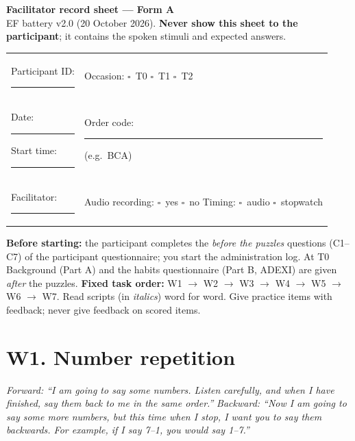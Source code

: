 \documentclass[10pt,a4paper]{article}
\newcommand{\blank}[1][1.2cm]{\rule{#1}{0.4pt}}
\newcommand{\bx}{$\square$}
\begin{document}
\begin{center}{\LARGE\bfseries Facilitator record sheet --- Form A}\\[3pt]
{\small EF battery v2.0 (20 October 2026). \textbf{Never show this sheet to the participant}; it contains the spoken stimuli and expected answers.}\end{center}
\begin{tabular}{@{}p{8cm}p{8cm}@{}}
Participant ID: \blank[4cm] & Occasion: \bx\ T0 \quad \bx\ T1 \quad \bx\ T2\\
Date: \blank[4cm] \quad Start time: \blank[2cm] & Order code: \blank[2cm] (e.g.\ BCA)\\
Facilitator: \blank[4cm] & Audio recording: \bx\ yes \quad \bx\ no \quad Timing: \bx\ audio \bx\ stopwatch\\
\end{tabular}

\textbf{Before starting:} the participant completes the \emph{before the puzzles} questions (C1--C7) of the participant questionnaire; you start the administration log. At T0 Background (Part A) and the habits questionnaire (Part B, ADEXI) are given \emph{after} the puzzles.
\textbf{Fixed task order:} W1 $\rightarrow$ W2 $\rightarrow$ W3 $\rightarrow$ W4 $\rightarrow$ W5 $\rightarrow$ W6 $\rightarrow$ W7. Read scripts (in \textit{italics}) word for word. Give practice items with feedback; never give feedback on scored items.

\section*{W1. Number repetition}
\textit{Forward: ``I am going to say some numbers. Listen carefully, and when I have finished, say them back to me in the same order.''}
\textit{Backward: ``Now I am going to say some more numbers, but this time when I stop, I want you to say them backwards. For example, if I say 7--1, you would say 1--7.''}
\end{document}

